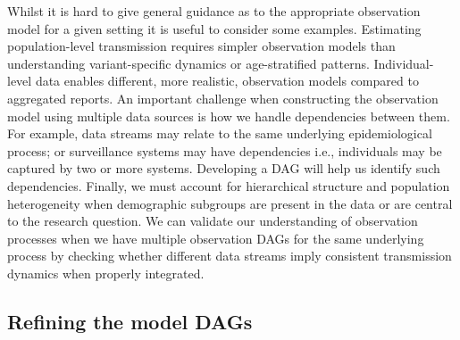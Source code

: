 \documentclass{article}
\begin{document}
Whilst it is hard to give general guidance as to the appropriate observation model for a given setting it is useful to consider some examples.
Estimating population-level transmission requires simpler observation models than understanding variant-specific dynamics or age-stratified patterns.
Individual-level data enables different, more realistic, observation models compared to aggregated reports.
An important challenge when constructing the observation model using multiple data sources is how we handle dependencies between them. For example, data streams may relate to the same underlying epidemiological process; or surveillance systems may have dependencies i.e., individuals may be captured by two or more systems. Developing a \ac{DAG} will help us identify such dependencies.
Finally, we must account for hierarchical structure and population heterogeneity when demographic subgroups are present in the data or are central to the research question. We can validate our understanding of observation processes when we have multiple observation \ac{DAG}s for the same underlying process by checking whether different data streams imply consistent transmission dynamics when properly integrated.

\subsection{Refining the model DAGs} \label{sec:refine-dags}
\end{document}
